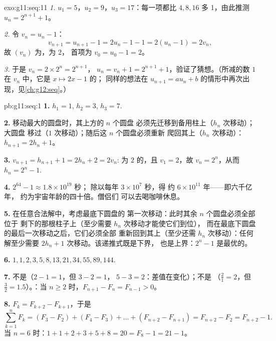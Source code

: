 \begin{solution}{exo:g11:seq:11}
\emph{1.} $u_1 = 5$，$u_2 = 9$，$u_3 = 17$：每一项都比
$4, 8, 16$ 多 1，由此推测 $u_n = 2^{n+1} + 1$。

\emph{2.} 令 $v_n = u_n - 1$：
\[
v_{n+1} = u_{n+1} - 1 = 2u_n - 1 - 1 = 2(u_n - 1) = 2v_n,
\]
故 $(v_n)$ 为，为 $2$，
首项为 $v_0 = u_0 - 1 = 2$。

\emph{3.} 于是 $v_n = 2 \times 2^n = 2^{n+1}$，
$u_n = v_n + 1 = 2^{n+1} + 1$，验证了猜想。（所减的数 $1$
在 $v_n$ 中，它是 $x \mapsto 2x - 1$ 的；
同样的想法在 $u_{n+1} = au_n + b$ 的情形中再次出现，见\cref{ch:g12:seq}。）
\end{solution}

\begin{solution}{pb:g11:seq:1}
\textbf{1.} $h_1 = 1$, $h_2 = 3$, $h_3 = 7$.

\textbf{2.} 移动最大的圆盘时，其上方的 $n$ 个圆盘
必须先迁移到备用柱上（$h_n$ 次移动）；大圆盘
移过（$1$ 次移动）；随后这 $n$ 个圆盘必须重新
爬回其上（$h_n$ 次移动）：$h_{n+1} = 2h_n + 1$。

\textbf{3.} $v_{n+1} = h_{n+1} + 1 = 2h_n + 2 = 2v_n$:
为 $2$ 的，且 $v_1 = 2$，故 $v_n = 2^n$，从而
$h_n = 2^n - 1$.

\textbf{4.} $2^{64} - 1 \approx 1.8 \times 10^{19}$ 秒；
除以每年 $3 \times 10^7$ 秒，得
约 $6 \times 10^{11}$ 年——即六千亿年，
约为宇宙年龄的四十倍。僧侣们
可以去喝咖啡休息。

\textbf{5.} 在任意合法解中，考虑最底下圆盘的
第一次移动：此时其余 $n$ 个圆盘必须全部位于
剩下的那根柱子上（至少需要 $h_n$ 次移动才能使它们到位），
而在最底下圆盘的最后一次移动之后，它们必须全部
重新回到其上（至少还需 $h_n$ 次移动）：任何解至少需要
$2h_n + 1$ 次移动。该递推式既是下界，
也是上界：$2^n - 1$ 是最优的。

\textbf{6.} $1, 1, 2, 3, 5, 8, 13, 21, 34, 55, 89, 144$.

\textbf{7.} 不是（$2 - 1 = 1$，但 $3 - 2 = 1$，
$5 - 3 = 2$：差值在变化）；不是
（$\frac21 = 2$，但 $\frac32 = 1.5$）。：当
$n \geq 2$ 时，$F_{n+1} - F_n = F_{n-1} > 0$。

\textbf{8.} $F_k = F_{k+2} - F_{k+1}$，于是
\[
\sum_{k=1}^{n} F_k = (F_3 - F_2) + (F_4 - F_3) + \dots +
(F_{n+2} - F_{n+1}) = F_{n+2} - F_2 = F_{n+2} - 1 .
\]
当 $n = 6$ 时：$1 + 1 + 2 + 3 + 5 + 8 = 20 = F_8 - 1 = 21 - 1$。


\end{solution}
